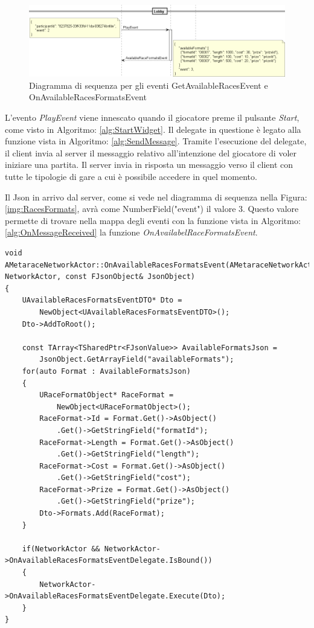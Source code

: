         \begin{figure}[b]\label{img:RacesFormats}
            \centering
            \includegraphics[width=14.5cm]{figure/RacesFormats.png}
            \caption{Diagramma di sequenza per gli eventi GetAvailableRacesEvent e OnAvailableRacesFormatsEvent}
            \label{img:PlayEvent}
        \end{figure}

        L'evento \textit{PlayEvent} viene innescato quando il giocatore preme il pulsante \textit{Start}, come visto in Algoritmo: \ref{alg:StartWidget}.
        Il delegate in questione è legato alla funzione vista in Algoritmo: \ref{alg:SendMessage}.
        Tramite l'esecuzione del delegate, il client invia al server il messaggio relativo all'intenzione del giocatore di voler iniziare una partita.
        Il server invia in risposta un messaggio verso il client con tutte le tipologie di gare a cui è possibile accedere in quel momento.

        Il Json in arrivo dal server, come si vede nel diagramma di sequenza nella Figura: \ref{img:RacesFormats}, avrà come NumberField("event") il valore 3.
        Questo valore permette di trovare nella mappa degli eventi con la funzione vista in Algoritmo:\ref{alg:OnMessageReceived} la funzione \textit{OnAvailabelRaceFormatsEvent}.

        \begin{lstlisting}[caption = Funzione OnAvailabelRaceFormatsEvent, label = {alg:OnAvailabelRaceFormatsEvent}]
void AMetaraceNetworkActor::OnAvailableRacesFormatsEvent(AMetaraceNetworkActor* NetworkActor, const FJsonObject& JsonObject)
{
    UAvailableRacesFormatsEventDTO* Dto = 
        NewObject<UAvailableRacesFormatsEventDTO>();
    Dto->AddToRoot();

    const TArray<TSharedPtr<FJsonValue>> AvailableFormatsJson = 
        JsonObject.GetArrayField("availableFormats");
    for(auto Format : AvailableFormatsJson)
    {
        URaceFormatObject* RaceFormat = 
            NewObject<URaceFormatObject>();
        RaceFormat->Id = Format.Get()->AsObject()
            .Get()->GetStringField("formatId");
        RaceFormat->Length = Format.Get()->AsObject()
            .Get()->GetStringField("length");
        RaceFormat->Cost = Format.Get()->AsObject()
            .Get()->GetStringField("cost");
        RaceFormat->Prize = Format.Get()->AsObject()
            .Get()->GetStringField("prize");
        Dto->Formats.Add(RaceFormat);		
    }

    if(NetworkActor && NetworkActor->OnAvailableRacesFormatsEventDelegate.IsBound())
    {
        NetworkActor->OnAvailableRacesFormatsEventDelegate.Execute(Dto);
    }
}
        \end{lstlisting}

